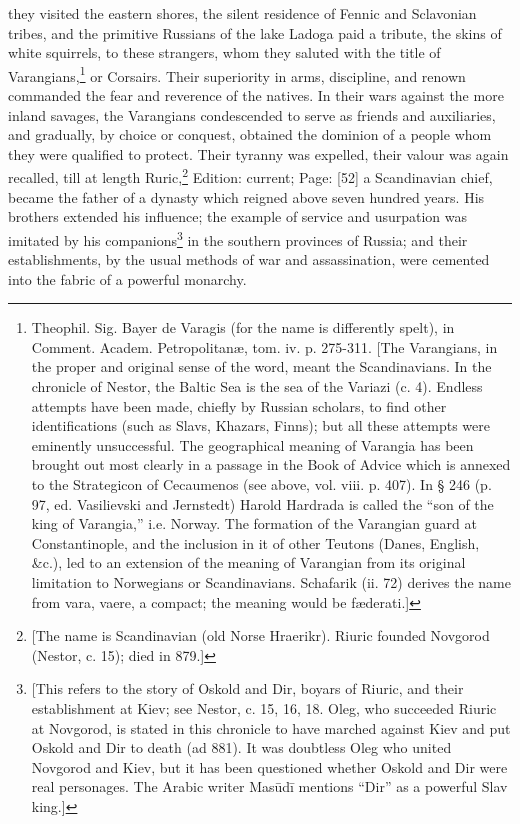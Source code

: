 they visited the eastern shores, the silent residence of Fennic and Sclavonian tribes, and the primitive Russians of the lake Ladoga paid a tribute, the skins of white squirrels, to these strangers, whom they saluted with the title of Varangians,\footnote{Theophil. Sig. Bayer de Varagis (for the name is differently spelt), in Comment. Academ. Petropolitanæ, tom. iv. p. 275-311. [The Varangians, in the proper and original sense of the word, meant the Scandinavians. In the chronicle of Nestor, the Baltic Sea is the sea of the Variazi (c. 4). Endless attempts have been made, chiefly by Russian scholars, to find other identifications (such as Slavs, Khazars, Finns); but all these attempts were eminently unsuccessful. The geographical meaning of Varangia has been brought out most clearly in a passage in the Book of Advice which is annexed to the Strategicon of Cecaumenos (see above, vol. viii. p. 407). In § 246 (p. 97, ed. Vasilievski and Jernstedt) Harold Hardrada is called the \texthebrew{“}son of the king of Varangia,\texthebrew{}” i.e. Norway. The formation of the Varangian guard at Constantinople, and the inclusion in it of other Teutons (Danes, English, \&c.), led to an extension of the meaning of Varangian from its original limitation to Norwegians or Scandinavians. Schafarik (ii. 72) derives the name from vara, vaere, a compact; the meaning would be fæderati.]} or Corsairs. Their superiority in arms, discipline, and renown commanded the fear and reverence of the natives. In their wars against the more inland savages, the Varangians condescended to serve as friends and auxiliaries, and gradually, by choice or conquest, obtained the dominion of a people whom they were qualified to protect. Their tyranny was expelled, their valour was again recalled, till at length Ruric,\footnote{[The name is Scandinavian (old Norse Hraerikr). Riuric founded Novgorod (Nestor, c. 15); died in 879.]} Edition: current; Page: [52] a Scandinavian chief, became the father of a dynasty which reigned above seven hundred years. His brothers extended his influence; the example of service and usurpation was imitated by his companions\footnote{[This refers to the story of Oskold and Dir, boyars of Riuric, and their establishment at Kiev; see Nestor, c. 15, 16, 18. Oleg, who succeeded Riuric at Novgorod, is stated in this chronicle to have marched against Kiev and put Oskold and Dir to death (ad 881). It was doubtless Oleg who united Novgorod and Kiev, but it has been questioned whether Oskold and Dir were real personages. The Arabic writer Masūdī mentions \texthebrew{“}Dir\texthebrew{}” as a powerful Slav king.]} in the southern provinces of Russia; and their establishments, by the usual methods of war and assassination, were cemented into the fabric of a powerful monarchy.


